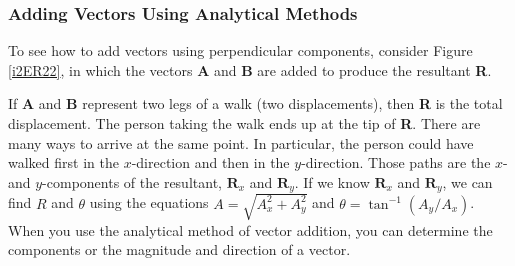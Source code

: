 \documentclass[main-ap-physics.tex]{subfiles}
\begin{document}
\subsubsection*{Adding Vectors Using Analytical Methods}

To see how to add vectors using perpendicular components, consider Figure \ref{i2ER22}, in which the vectors \textbf{A} and \textbf{B} are added to produce the resultant \textbf{R}.


\begin{center}
    \captionsetup{type=figure,margin=1in,font=scriptsize}
    \label{i2ER22}
\end{center}

If \textbf{A} and \textbf{B} represent two legs of a walk (two displacements), then \textbf{R} is the total displacement. The person taking the walk ends up at the tip of \textbf{R}. There are many ways to arrive at the same point. In particular, the person could have walked first in the $x$-direction and then in the $y$-direction. Those paths are the $x$- and $y$-components of the resultant, $\textbf{R}_x$ and $\textbf{R}_y$. If we know $\textbf{R}_x$ and $\textbf{R}_y$, we can find $R$ and $\theta$ using the equations $A = \sqrt{A_x^2 + A_y^2}$ and $\theta = \tan^{-1} (A_y/A_x)$. When you use the analytical method of vector addition, you can determine the components or the magnitude and direction of a vector.
\end{document}
